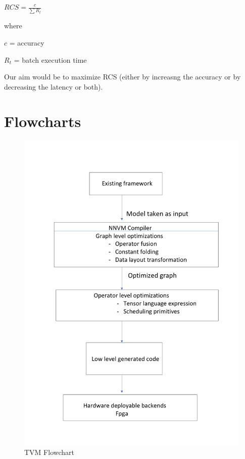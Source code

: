 \documentclass[titlepage]{report}
\begin{document}
$RCS = \frac{c}{\sum R_t}$    

where   

$c$ = accuracy    

      $R_t$ = batch execution time  
      
Our aim would be to maximize RCS (either by increasng the accuracy or by decreasing the latency or both).


\chapter{Flowcharts}

\begin{figure}[h!]
    \centering
    \includegraphics[scale=0.19]{TVM_Flowchart.jpg}
    \caption{TVM Flowchart}
\end{figure}
\end{document}
